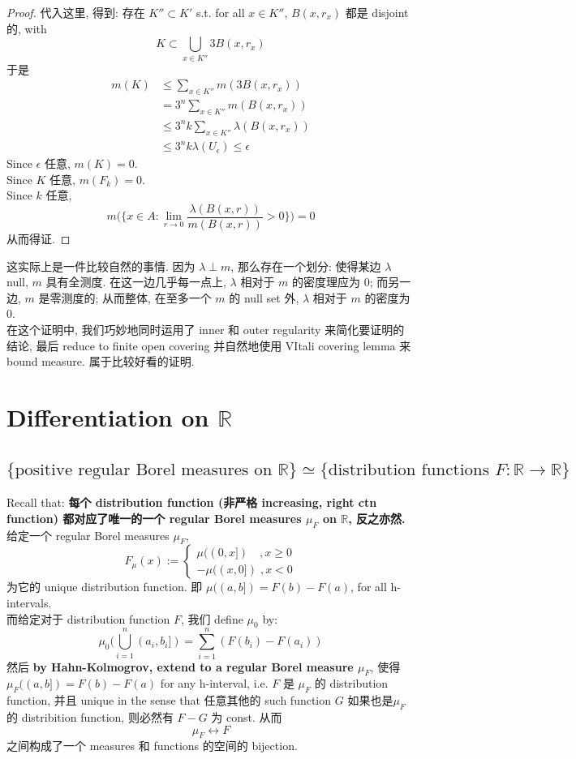 \documentclass[lang=cn,11pt]{elegantbook}
\begin{document}
\begin{proof}
代入这里, 得到: 存在 $K'' \subset K'$ s.t. for all $x\in K''$, $B(x,r_x)$ 都是 disjoint 的, with \[
K \subset\bigcup_{x\in K''} 3 B(x,r_x)
\]
于是 \begin{align*}
    m(K) &\leq \sum_{x\in K''} m(3B(x,r_x))\\
    & = 3^n  \sum_{x\in K''} m(B(x,r_x))\\
    &\leq 3^n   k \sum_{x\in K''} \lambda(B(x,r_x))\\
    &\leq 3^n k \lambda(U_\epsilon) \leq  \epsilon
\end{align*}
Since $\epsilon$ 任意, $m(K) = 0$.\\
Since $K$ 任意, $m(F_k) = 0$.\\
Since $k$ 任意, \[
m\bigg( \bigg\{x\in A : \lim _{r \rightarrow 0} \frac{\lambda(B(x, r))}{m(B(x, r))} > 0  \bigg\}\bigg) =  0 
\]
从而得证.
\end{proof}
 \begin{remark}
     这实际上是一件比较自然的事情. 因为 $\lambda\perp m$, 那么存在一个划分: 使得某边 $\lambda$ null, $m$ 具有全测度.   在这一边几乎每一点上, $\lambda$ 相对于 $m$ 的密度理应为 $0$; 而另一边, $m$ 是零测度的; 从而整体, 在至多一个 $m$ 的 null set 外,  $\lambda$ 相对于 $m$ 的密度为 $0$.\\
     在这个证明中, 我们巧妙地同时运用了 inner 和 outer regularity 来简化要证明的结论, 最后 reduce to finite open covering 并自然地使用  VItali covering lemma 来 bound measure. 属于比较好看的证明.
 \end{remark}


\section{Differentiation on $\mathbb{R}$}
\subsection{$\{\text{positive regular Borel measures on }\mathbb{R}\} \simeq \{\text{distribution functions }F:\mathbb{R}\to\mathbb{R} \}$}
Recall that: 
\textbf{每个 distribution function (非严格 increasing, right ctn function) 都对应了唯一的一个  regular Borel measures $\mu_F$ on $\mathbb{R}$, 反之亦然.}\\
给定一个 regular Borel measures $\mu_F$,
$$
F_\mu(x ) := \begin{cases}
    \mu((0,x]) \quad  , x \geq 0 \\
     -\mu((x,0]) \; , x < 0
\end{cases}
$$
为它的 unique distribution function. 即 $\mu((a,b]) = F(b) - F(a)$, for all h-intervals.\\
而给定对于 distribution function $F$, 我们 define $\mu_0$ by:
$$
\mu_0(\bigcup_{i=1}^n (a_i, b_i]) = \sum_{i=1}^n (F(b_i) - F(a_i))
$$
然后 \textbf{by Hahn-Kolmogrov, extend to a regular Borel measure $\mu_F$}, 使得 $\mu_F ((a,b]) = F(b) - F(a)$ for any h-interval, i.e. $F$ 是 $\mu_F$ 的 distribution function, 并且 unique in the sense that 任意其他的 such function $G$ 如果也是$\mu_F$ 的 distribition function, 则必然有 $F-G$ 为 const. 
从而 \[
\mu_F \longleftrightarrow F
\]
之间构成了一个 measures 和 functions 的空间的 bijection.
\end{document}
